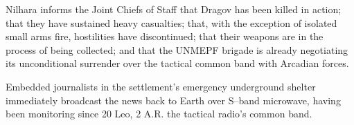 Nilhara informs the Joint Chiefs of Staff that Dragov has been killed in action; that they have sustained heavy casualties; that, with the exception of isolated small arms fire, hostilities have discontinued; that their weapons are in the process of being collected; and that the UNMEPF brigade is already negotiating its unconditional surrender over the tactical common band with Arcadian forces.

Embedded journalists in the settlement's emergency underground shelter immediately broadcast the news back to Earth over S--band microwave, having been monitoring since 20 Leo, 2 A.R. the tactical radio's common band.
\StopTimelineDate


